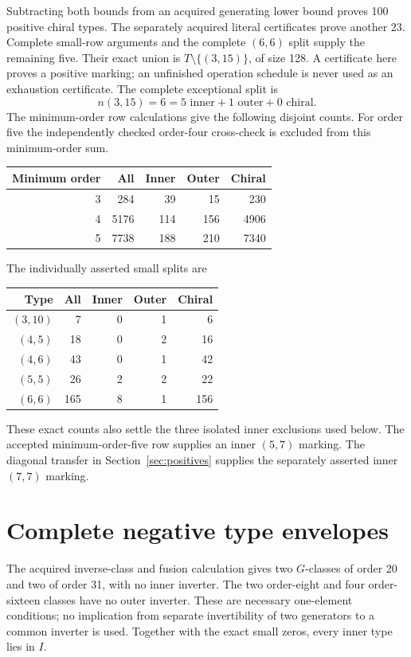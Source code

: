 \documentclass[11pt,a4paper]{article}
\begin{document}
Subtracting both bounds from an acquired generating lower bound proves
100 positive chiral types. The separately acquired literal certificates
prove another 23. Complete small-row arguments and the complete
$(6,6)$ split supply the remaining five. Their exact union is
$T\setminus\{(3,15)\}$, of size 128. A certificate here proves a
positive marking; an unfinished operation schedule is never used as an
exhaustion certificate. The complete exceptional split is
\[
 n(3,15)=6=5\text{ inner}+1\text{ outer}+0\text{ chiral}.
\]
The minimum-order row calculations give the following disjoint counts.
For order five the independently checked order-four cross-check is
excluded from this minimum-order sum.
\begin{center}
\begin{tabular}{rrrrr}\toprule
Minimum order&All&Inner&Outer&Chiral\\\midrule
3&284&39&15&230\\
4&5176&114&156&4906\\
5&7738&188&210&7340\\\bottomrule
\end{tabular}
\end{center}
The individually asserted small splits are
\begin{center}
\begin{tabular}{rrrrr}\toprule
Type&All&Inner&Outer&Chiral\\\midrule
$(3,10)$&7&0&1&6\\
$(4,5)$&18&0&2&16\\
$(4,6)$&43&0&1&42\\
$(5,5)$&26&2&2&22\\
$(6,6)$&165&8&1&156\\\bottomrule
\end{tabular}
\end{center}
These exact counts also settle the three isolated inner exclusions used
below. The accepted minimum-order-five row supplies an inner $(5,7)$
marking. The diagonal transfer in Section~\ref{sec:positives} supplies
the separately asserted inner $(7,7)$ marking.

\section{Complete negative type envelopes}\label{sec:envelopes}
The acquired inverse-class and fusion calculation gives two $G$-classes
of order 20 and two of order 31, with no inner inverter. The two
order-eight and four order-sixteen classes have no outer inverter.
These are necessary one-element conditions; no implication from separate
invertibility of two generators to a common inverter is used. Together
with the exact small zeros, every inner type lies in $I$.
\end{document}
